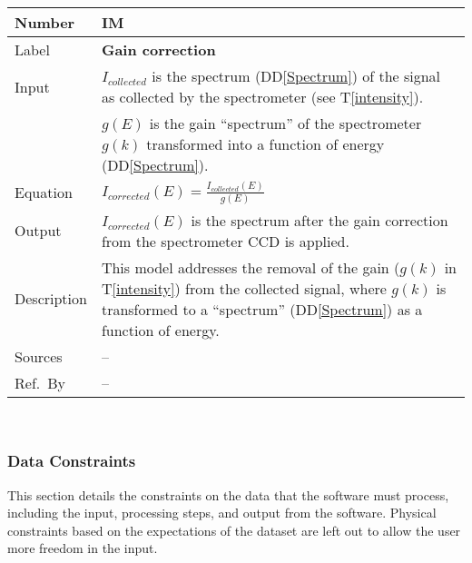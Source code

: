 \documentclass[12pt]{article}
\newcommand{\colAwidth}{0.13\textwidth}
\newcommand{\colBwidth}{0.82\textwidth}
\newcommand{\ddref}[1]{DD\ref{#1}}
\newcommand{\tref}[1]{T\ref{#1}}
\newcounter{instnum} %
\begin{document}
\noindent
\begin{minipage}{\textwidth}
	\renewcommand*{\arraystretch}{1.5}
	\begin{tabular}{| p{\colAwidth} | p{\colBwidth}|}
		\hline
		\rowcolor[gray]{0.9}
		Number& IM{instnum}\theinstnum \label{gain}\\
		\hline
		Label& \bf Gain correction\\
		\hline
		Input & $I_{collected}$ is the spectrum (\ddref{Spectrum}) of the signal as
collected by the spectrometer (see \tref{intensity}).\\
		& $g(E)$ is the gain ``spectrum'' of the spectrometer $g(k)$ transformed into
a function of energy (\ddref{Spectrum}).\\
		\hline
		Equation & $I_{corrected}(E)=\frac{I_{collected}(E)}{g(E)}$\\
		\hline
		Output& $I_{corrected}(E)$ is the spectrum after the gain correction from the
spectrometer CCD is applied.\\
		\hline
		Description & This model addresses the removal of the gain ($g(k)$ in
\tref{intensity}) from the collected signal, where $g(k)$ is transformed to a
``spectrum'' (\ddref{Spectrum}) as a function of energy.\\
		\hline
		Sources & --\\
		\hline
		Ref.\ By & --\\
		\hline
	\end{tabular}
\end{minipage}\\

\subsubsection{Data Constraints} \label{sec_DataConstraints}    
This section details the constraints on the data that the software must process,
including the input, processing steps, and output from the software. Physical
constraints based on the expectations of the dataset are left out to allow the
user more freedom in the input.
\end{document}
